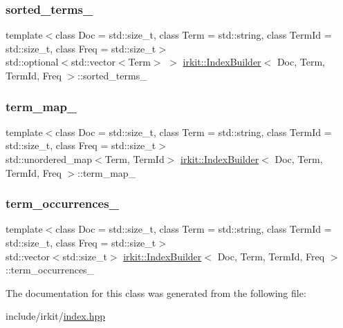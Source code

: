 \subsubsection{\texorpdfstring{sorted\+\_\+terms\+\_\+}{sorted\_terms\_}}
{\footnotesize\ttfamily template$<$class Doc  = std\+::size\+\_\+t, class Term  = std\+::string, class Term\+Id  = std\+::size\+\_\+t, class Freq  = std\+::size\+\_\+t$>$ \\
std\+::optional$<$std\+::vector$<$Term$>$ $>$ \hyperlink{classirkit_1_1IndexBuilder}{irkit\+::\+Index\+Builder}$<$ Doc, Term, Term\+Id, Freq $>$\+::sorted\+\_\+terms\+\_\+\hspace{0.3cm}{\ttfamily [protected]}}

\mbox{\label{classirkit_1_1IndexBuilder_aeebb03b89eeab532f62239e4ea4f0bee}} 
\subsubsection{\texorpdfstring{term\+\_\+map\+\_\+}{term\_map\_}}
{\footnotesize\ttfamily template$<$class Doc  = std\+::size\+\_\+t, class Term  = std\+::string, class Term\+Id  = std\+::size\+\_\+t, class Freq  = std\+::size\+\_\+t$>$ \\
std\+::unordered\+\_\+map$<$Term, Term\+Id$>$ \hyperlink{classirkit_1_1IndexBuilder}{irkit\+::\+Index\+Builder}$<$ Doc, Term, Term\+Id, Freq $>$\+::term\+\_\+map\+\_\+\hspace{0.3cm}{\ttfamily [protected]}}

\mbox{\label{classirkit_1_1IndexBuilder_aaa27520f3a0fb37dba049d2c26ad9484}} 
\subsubsection{\texorpdfstring{term\+\_\+occurrences\+\_\+}{term\_occurrences\_}}
{\footnotesize\ttfamily template$<$class Doc  = std\+::size\+\_\+t, class Term  = std\+::string, class Term\+Id  = std\+::size\+\_\+t, class Freq  = std\+::size\+\_\+t$>$ \\
std\+::vector$<$std\+::size\+\_\+t$>$ \hyperlink{classirkit_1_1IndexBuilder}{irkit\+::\+Index\+Builder}$<$ Doc, Term, Term\+Id, Freq $>$\+::term\+\_\+occurrences\+\_\+\hspace{0.3cm}{\ttfamily [protected]}}



The documentation for this class was generated from the following file\+:\begin{DoxyCompactItemize}
\item 
include/irkit/\hyperlink{irkit_2index_8hpp}{index.\+hpp}\end{DoxyCompactItemize}
